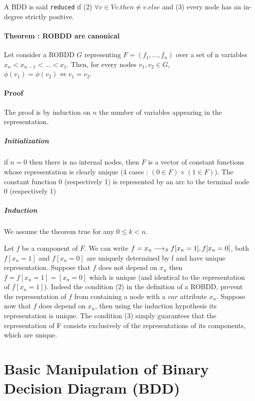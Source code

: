 \documentclass[a4paper,10pt]{article}
\begin{document}
A BDD is said \texttt{reduced} if (2) $\forall v\in V v.then \neq v.else$ and (3) every node has an in-degree strictly positive.

\paragraph{Theorem : ROBDD are canonical\\}

Let consider a ROBDD $G$ representing $F=(f_1, ..., f_n)$ over a set of n variables $x_n < x_{n-1} < ... < x_1$. Then, for every nodes $v_1, v_2 \in G$, $\phi(v_1) = \phi(v_2) \Leftrightarrow v_1 = v_2$.

\paragraph{Proof\\}
The proof is by induction on $n$ the number of variables appearing in the representation.
\subparagraph{Initialization\\}
if $n=0$ then there is no internal nodes, then $F$ is a vector of constant functions whose representation is clearly unique (4 cases : $(0\in F) \times (1\in F)$).
The constant function 0 (respectively 1) is represented by an arc to the terminal node 0 (respectively 1)
\subparagraph{Induction\\}
We assume the theorem true for any $0 \leq k < n$.

Let $f$ be a component of $F$. We can write $f = x_n \longrightarrow_S f[x_n=1], f[x_n=0]$, both $f[x_n=1]$ and $f[x_n=0]$ are uniquely determined by f and have unique representation.
Suppose that $f$ does not depend on $x_n$ then $f=f[x_n=1]=[x_n=0]$ which is unique (and identical to the representation of $f[x_n=1]$).
Indeed the condition (2) in the definition of a ROBDD, prevent the representation of $f$ from containing a node with a $var$ attribute $x_n$.
Suppose now that $f$ does depend on $x_n$, then using the induction hypothesis its representation is unique.
The condition (3) simply guarantees that the representation of F consists exclusively of the representations of its components, which are unique.


\section{Basic Manipulation of Binary Decision Diagram (BDD)}
\end{document}
